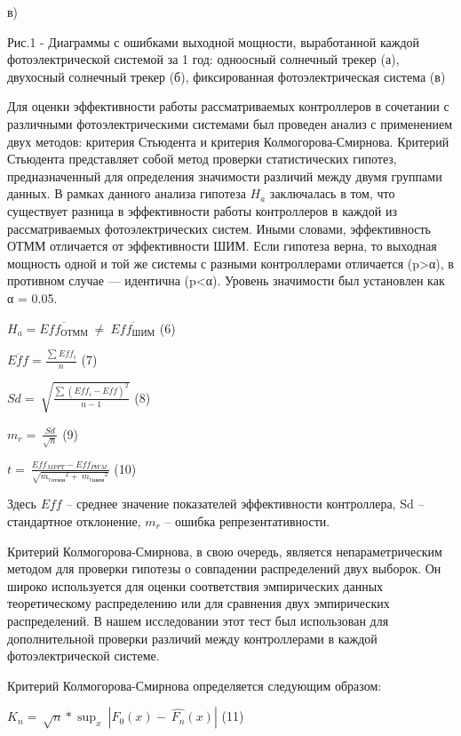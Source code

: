 в)

Рис.1 - Диаграммы с ошибками выходной мощности, выработанной каждой
фотоэлектрической системой за 1 год: одноосный солнечный трекер (а),
двухосный солнечный трекер (б), фиксированная фотоэлектрическая система
(в)

\begin{multicols}{2}
Для оценки эффективности работы рассматриваемых контроллеров в сочетании
с различными фотоэлектрическими системами был проведен анализ с
применением двух методов: критерия Стьюдента и критерия
Колмогорова-Смирнова. Критерий Стьюдента представляет собой метод
проверки статистических гипотез, предназначенный для определения
значимости различий между двумя группами данных. В рамках данного
анализа гипотеза \(H_{a}\) заключалась в том, что существует разница в
эффективности работы контроллеров в каждой из рассматриваемых
фотоэлектрических систем. Иными словами, эффективность ОТММ отличается
от эффективности ШИМ. Если гипотеза верна, то выходная мощность одной и
той же системы с разными контроллерами отличается (p\textgreater α), в
противном случае --- идентична (p\textless α). Уровень значимости был
установлен как α = 0.05.

\(H_{a} = \overline{{Eff}_{ОТММ}}\  \neq \ \overline{{Eff}_{ШИМ}}\) (6)

\(\overline{Eff} = \frac{\sum_{}^{}{Eff}_{i}}{n}\) (7)

\(Sd = \ \sqrt{\frac{\sum_{}^{}{({Eff}_{i} - \overline{Eff})}^{2}}{n - 1}}\)
(8)

\(m_{r} = \ \frac{Sd}{\sqrt{n}}\) (9)

\(t = \ \frac{{Eff}_{MPPT} - {Eff}_{PWM}\ }{\sqrt{{m_{rотмм}}^{2} + \ {m_{rшим}}^{2}}}\)
(10)

Здесь \(\underline{Eff}\) -- среднее значение показателей эффективности
контроллера, Sd -- стандартное отклонение, \(m_{r}\) -- ошибка
репрезентативности.

Критерий Колмогорова-Смирнова, в свою очередь, является
непараметрическим методом для проверки гипотезы о совпадении
распределений двух выборок. Он широко используется для оценки
соответствия эмпирических данных теоретическому распределению или для
сравнения двух эмпирических распределений. В нашем исследовании этот
тест был использован для дополнительной проверки различий между
контроллерами в каждой фотоэлектрической системе.

Критерий Колмогорова-Смирнова определяется следующим образом:

\(K_{n} = \ \sqrt{n}*\sup_{x}\ \left| F_{0}(x) - \ \widehat{F_{n}}(x) \right|\)
(11)


\end{multicols}
